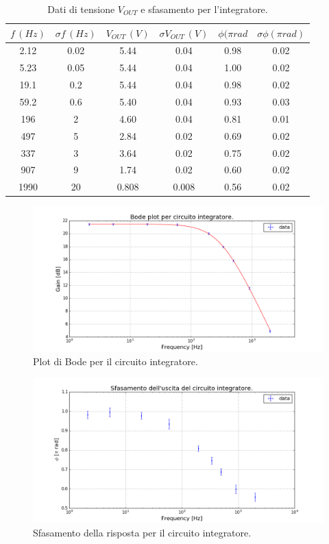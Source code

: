 \documentclass[10pt,a4paper]{article}
\begin{document}
\begin{table}[!htb]\centering
\begin{tabular}{|c|c|c|c|c|c|}
\hline$f \, (Hz)$ & $ \sigma f \, (Hz)$ & $V_{OUT} \, (V)$ & $\sigma V_{OUT} \, (V)$ & $\phi (\pi rad$ & $\sigma \phi (\pi rad)$\\
\hline
2.12 & 0.02 & 5.44 & 0.04 & 0.98 & 0.02\\
5.23 & 0.05 & 5.44 & 0.04 & 1.00 & 0.02\\
19.1 & 0.2 & 5.44 & 0.04 & 0.98 & 0.02\\
59.2 & 0.6 & 5.40 & 0.04 & 0.93 & 0.03\\
196 & 2 & 4.60 & 0.04 & 0.81 & 0.01\\
497 & 5 & 2.84 & 0.02 & 0.69 & 0.02\\
337 & 3 & 3.64 & 0.02 & 0.75 & 0.02\\
907 & 9 & 1.74 & 0.02 & 0.60 & 0.02\\
1990 & 20 & 0.808 & 0.008 & 0.56 & 0.02\\
\hline
\end{tabular}
\caption{Dati di tensione $V_{OUT}$ e sfasamento per l'integratore.}
\label{tabellaIntegratore}
\end{table}


\begin{figure}[!htb]
\centering
  \includegraphics[scale=0.5]{bodeIntegratore.png}
\caption{Plot di Bode per il circuito integratore.}
\label{plotIntegratore}
\end{figure}

\begin{figure}[!htb]
\centering
  \includegraphics[scale=0.5]{integratoreSfasamento.png}
\caption{Sfasamento della risposta per il circuito integratore.}
\label{plotIntegratore2}
\end{figure}
\end{document}
